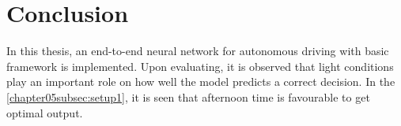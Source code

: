\chapter{Conclusion}

In this thesis, an end-to-end neural network for autonomous driving with basic framework
is implemented. Upon evaluating, it is observed that light conditions play an important
role on how well the model predicts a correct decision. In the
\ref{chapter05subsec:setup1}, it is seen that afternoon time is favourable to get optimal output.
